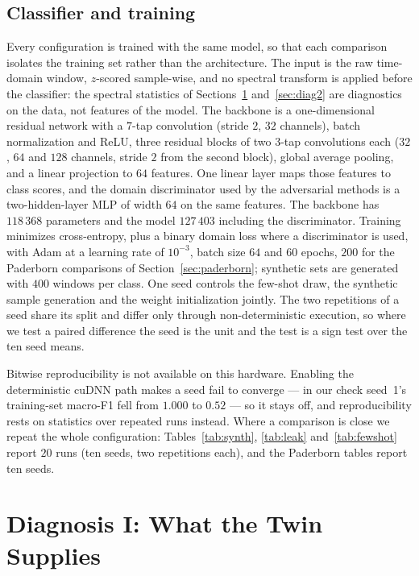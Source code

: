 \documentclass[preprint,12pt]{elsarticle}
\begin{document}
\subsection{Classifier and training}
\label{sec:classifier}
Every configuration is trained with the same model, so that each comparison
isolates the training set rather than the architecture. The input is the raw
time-domain window, $z$-scored sample-wise, and no spectral transform is applied
before the classifier: the spectral statistics of
Sections~\ref{sec:diag1} and~\ref{sec:diag2} are diagnostics on the data, not
features of the model. The backbone is a one-dimensional residual network with a
$7$-tap convolution (stride $2$, $32$ channels), batch normalization and ReLU,
three residual blocks of two $3$-tap convolutions each ($32$, $64$ and $128$
channels, stride $2$ from the second block), global average pooling, and a
linear projection to $64$ features. One linear layer maps those features to
class scores, and the domain discriminator used by the adversarial methods is a
two-hidden-layer MLP of width $64$ on the same features. The backbone has
$118\,368$ parameters and the model $127\,403$ including the discriminator.
Training minimizes cross-entropy, plus a binary domain loss where a
discriminator is used, with Adam at a learning rate of $10^{-3}$, batch size
$64$ and $60$ epochs, $200$ for the Paderborn comparisons of
Section~\ref{sec:paderborn}; synthetic sets are generated with $400$ windows per
class. One seed controls the few-shot draw, the synthetic sample generation and
the weight initialization jointly. The two repetitions of a seed share
its split and differ only through non-deterministic execution, so where
we test a paired difference the seed is the unit and the test is a sign
test over the ten seed means.

Bitwise reproducibility is not available on this hardware. Enabling the
deterministic cuDNN path makes a seed fail to converge --- in our check seed~1's
training-set macro-F1 fell from $1.000$ to $0.52$ --- so it stays off, and
reproducibility rests on statistics over repeated runs instead. Where a
comparison is close we repeat the whole configuration:
Tables~\ref{tab:synth}, \ref{tab:leak} and~\ref{tab:fewshot} report $20$ runs
(ten seeds, two repetitions each), and the Paderborn tables report ten seeds.

\section{Diagnosis I: What the Twin Supplies}
\label{sec:diag1}
\end{document}
